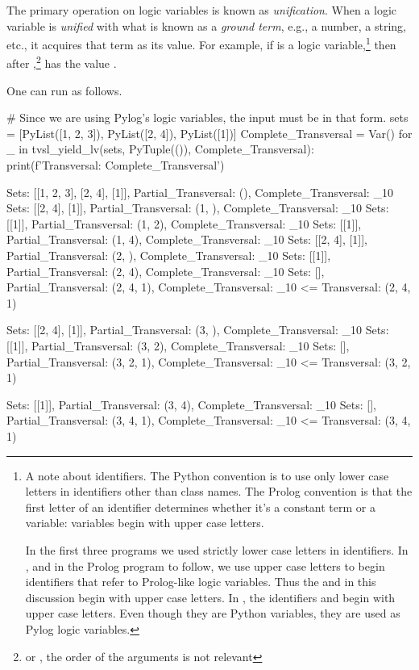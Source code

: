 The primary operation on logic variables is known as \textit{unification}. When a logic variable is \textit{unified} with what is known as a \textit{ground term}, e.g., a number, a string, etc., it acquires that term as its value. For example, if  is a logic variable,\footnote{A note about identifiers. The Python convention is to use only lower case letters in identifiers other than class names. The Prolog convention is that the first letter of an identifier determines whether it's a constant term or a variable: variables begin with upper case letters. 
\smallv
    
In the first three programs we used strictly lower case letters in identifiers. In , and in the Prolog program to follow, we use upper case letters to begin identifiers that refer to Prolog-like logic variables. Thus the  and   in this discussion begin with upper case letters. In , the identifiers  and  begin with upper case letters. Even though they are Python variables, they are used as Pylog logic variables.} then after ,\footnote{or , the order of the arguments is not relevant}  has the value . 

One can run  as follows. 

\begin{minipage}{\linewidth} \largev 
\begin{python}
# Since we are using Pylog's logic variables, the input must be in that form.
sets = [PyList([1, 2, 3]), PyList([2, 4]), PyList([1])]
Complete_Transversal = Var()
for _ in tvsl_yield_lv(sets, PyTuple(()), Complete_Transversal):
    print(f'Transversal: {Complete_Transversal}\n')
\end{python}
\end{minipage}

\begin{minipage}{\linewidth} \largev 
\begin{python}
Sets: [[1, 2, 3], [2, 4], [1]], Partial_Transversal: (), Complete_Transversal: _10
  Sets: [[2, 4], [1]], Partial_Transversal: (1, ), Complete_Transversal: _10
    Sets: [[1]], Partial_Transversal: (1, 2), Complete_Transversal: _10
    Sets: [[1]], Partial_Transversal: (1, 4), Complete_Transversal: _10
  Sets: [[2, 4], [1]], Partial_Transversal: (2, ), Complete_Transversal: _10
    Sets: [[1]], Partial_Transversal: (2, 4), Complete_Transversal: _10
      Sets: [], Partial_Transversal: (2, 4, 1), Complete_Transversal: _10 <=
Transversal: (2, 4, 1)

  Sets: [[2, 4], [1]], Partial_Transversal: (3, ), Complete_Transversal: _10
    Sets: [[1]], Partial_Transversal: (3, 2), Complete_Transversal: _10
      Sets: [], Partial_Transversal: (3, 2, 1), Complete_Transversal: _10 <=
Transversal: (3, 2, 1)

    Sets: [[1]], Partial_Transversal: (3, 4), Complete_Transversal: _10
      Sets: [], Partial_Transversal: (3, 4, 1), Complete_Transversal: _10 <=
Transversal: (3, 4, 1)
\end{python}
\end{minipage}

